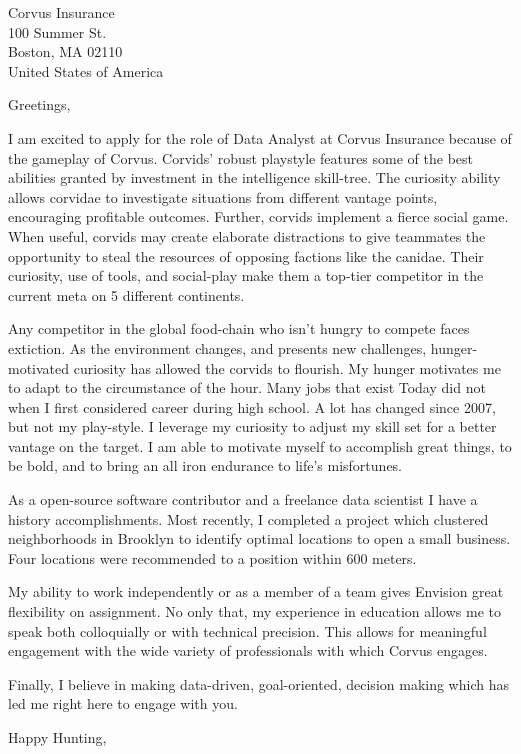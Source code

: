 \documentclass{letter}
\begin{document}
\begin{letter}{Corvus Insurance\\ 100 Summer St.\\ Boston, MA 02110\\ United States of America}
\opening{Greetings,}
I am excited to apply for the role of Data Analyst at Corvus Insurance because of the gameplay of Corvus.
Corvids' robust playstyle features some of the best abilities granted by investment in the intelligence skill-tree.
The curiosity ability allows corvidae to investigate situations from different vantage points, encouraging profitable outcomes.
Further, corvids implement a fierce social game. 
When useful, corvids may create elaborate distractions to give teammates the opportunity to steal the resources of opposing factions like the canidae.
Their curiosity, use of tools, and social-play make them a top-tier competitor in the current meta on 5 different continents.

Any competitor in the global food-chain who isn't hungry to compete faces extiction.
As the environment changes, and presents new challenges, hunger-motivated curiosity has allowed the corvids to flourish.
My hunger motivates me to adapt to the circumstance of the hour.
Many jobs that exist Today did not when I first considered career during high school.
A lot has changed since 2007, but not my play-style.
I leverage my curiosity to adjust my skill set for a better vantage on the target.
I am able to motivate myself to accomplish great things, to be bold, and to bring an all iron endurance to life's misfortunes.

As a open-source software contributor and a freelance data scientist I have a history accomplishments.
Most recently, I completed a project which clustered neighborhoods in Brooklyn to identify optimal locations to open a small business.
Four locations were recommended to a position within 600 meters.

My ability to work independently or as a member of a team gives Envision great flexibility on assignment.
No only that, my experience in education allows me to speak both colloquially or with technical precision.
This allows for meaningful engagement with the wide variety of professionals with which Corvus engages.

Finally, I believe in making data-driven, goal-oriented, decision making which has led me right here to engage with you. 
\closing{Happy Hunting,}
\end{letter}
\end{document}
